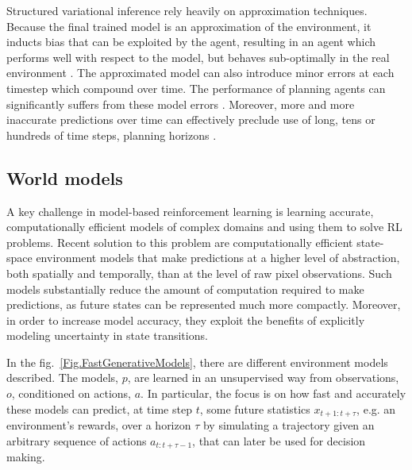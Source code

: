 Structured variational inference rely heavily on approximation techniques. Because the final trained model is an approximation of the environment, it inducts bias that can be exploited by the agent, resulting in an agent which performs well with respect to the model, but behaves sub-optimally in the real environment \cite{Algo.WorldModels}. The approximated model can also introduce minor errors at each timestep which compound over time. The performance of planning agents can significantly suffers from these model errors \cite{Study.PlanWithImperfectModel}. Moreover, more and more inaccurate predictions over time can effectively preclude use of long, tens or hundreds of time steps, planning horizons \cite{Algo.SimPLe}.

\subsection{World models} \label{Sec.FastWorldModels}

A key challenge in model-based reinforcement learning is learning accurate, computationally efficient models of complex domains and using them to solve RL problems. Recent solution \cite{Algo.FastGenerativeModels} to this problem are computationally efficient state-space environment models that make predictions at a higher level of abstraction, both spatially and temporally, than at the level of raw pixel observations. Such models substantially reduce the amount of computation required to make predictions, as future states can be represented much more compactly. Moreover, in order to increase model accuracy, they exploit the benefits of explicitly modeling uncertainty in state transitions.

In the fig.~\ref{Fig.FastGenerativeModels}, there are different environment models described. The models, $p$, are learned in an unsupervised way from observations, $o$, conditioned on actions, $a$. In particular, the focus is on how fast and accurately these models can predict, at time step $t$, some future statistics $x_{t+1:t+\tau}$, e.g. an environment's rewards, over a horizon $\tau$ by simulating a trajectory given an arbitrary sequence of actions $a_{t:t+\tau−1}$, that can later be used for decision making.

